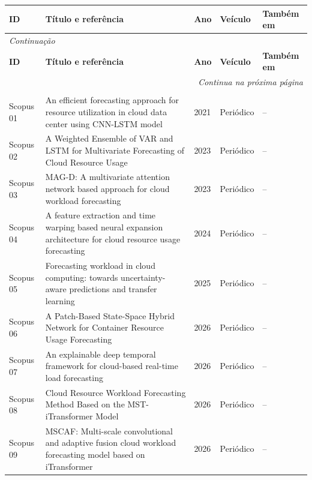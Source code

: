 {\footnotesize
\setlength{\tabcolsep}{3pt}
\renewcommand{\arraystretch}{1.15}
\begin{longtable}{p{1.4cm}p{9.3cm}p{0.9cm}p{1.5cm}p{1.7cm}}
\toprule
\textbf{ID} & \textbf{Título e referência} & \textbf{Ano} & \textbf{Veículo} & \textbf{Também em} \\
\midrule
\endfirsthead
\multicolumn{5}{l}{\textit{Continuação}}\\
\toprule
\textbf{ID} & \textbf{Título e referência} & \textbf{Ano} & \textbf{Veículo} & \textbf{Também em} \\
\midrule
\endhead
\midrule
\multicolumn{5}{r}{\textit{Continua na próxima página}}\\
\endfoot
\bottomrule
\multicolumn{5}{l}{Fonte: Elaborado pelo autor (2026).}\\
\endlastfoot
Scopus 01 & An efficient forecasting approach for resource utilization in cloud data center using CNN-LSTM model \cite{ouhame2021} & 2021 & Periódico & -- \\
Scopus 02 & A Weighted Ensemble of VAR and LSTM for Multivariate Forecasting of Cloud Resource Usage \cite{shetty2023} & 2023 & Periódico & -- \\
Scopus 03 & MAG-D: A multivariate attention network based approach for cloud workload forecasting \cite{patel2023} & 2023 & Periódico & -- \\
Scopus 04 & A feature extraction and time warping based neural expansion architecture for cloud resource usage forecasting \cite{singh2024} & 2024 & Periódico & -- \\
Scopus 05 & Forecasting workload in cloud computing: towards uncertainty-aware predictions and transfer learning \cite{rossi2025} & 2025 & Periódico & -- \\
Scopus 06 & A Patch-Based State-Space Hybrid Network for Container Resource Usage Forecasting \cite{song2026} & 2026 & Periódico & -- \\
Scopus 07 & An explainable deep temporal framework for cloud-based real-time load forecasting \cite{bawa2026} & 2026 & Periódico & -- \\
Scopus 08 & Cloud Resource Workload Forecasting Method Based on the MST-iTransformer Model \cite{xie2026} & 2026 & Periódico & -- \\
Scopus 09 & MSCAF: Multi-scale convolutional and adaptive fusion cloud workload forecasting model based on iTransformer \cite{liu2026} & 2026 & Periódico & -- \\

\end{longtable}}

